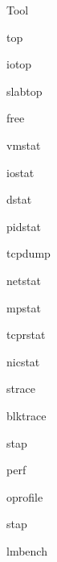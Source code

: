 Tool
\begin{enumbox}
\item top
\item iotop
\item slabtop
\item free
\item vmstat
\item iostat
\item dstat
\item pidstat
\item *
\item tcpdump
\item netstat
\item mpstat
\item tcprstat
\item nicstat
\item *
\item strace
\item blktrace
\item stap
\item perf
\item oprofile
\item stap
\item lmbench
\end{enumbox}
